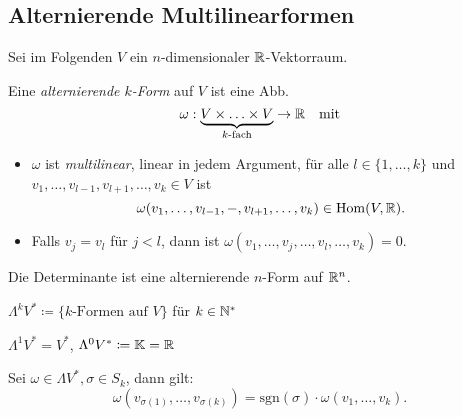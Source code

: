 \documentclass{cheat-sheet}
\theoremstyle{definition}
\begin{document}
\begin{samepage}



\section{Alternierende Multilinearformen}

\begin{nota}
  Sei im Folgenden $V$ ein $n$-dimensionaler $\mathbb{R}$-Vektorraum.
\end{nota}

\begin{defn}
  Eine \emph{alternierende $k$-Form} auf $V$ ist eine Abb.
  \[ \omega : \underbrace{V \times \ldots \times V}_{\text{$k$-fach}} \to \mathbb{R} \quad \text{mit} \]
  \begin{itemize}
    \item $\omega$ ist \emph{multilinear}, \dh{} linear in jedem Argument, \dh{} für alle $l \in \{ 1, \ldots, k \}$ und $v_1, \ldots, v_{l-1}, v_{l+1}, \ldots, v_k \in V$ ist
    \[ \omega(v_1, \ldots, v_{l-1}, -, v_{l+1}, \ldots, v_k) \in \mathrm{Hom}(V, \mathbb{R}). \]
    \item Falls $v_j = v_l$ für $j < l$, dann ist $\omega(v_1, \ldots, v_j, \ldots, v_l, \ldots, v_k) = 0$.
  \end{itemize}
\end{defn}

\begin{bsp}
  Die Determinante ist eine alternierende $n$-Form auf $\mathbb{R}^n$.
\end{bsp}

\begin{nota}
  $\Lambda^k V^* \coloneqq \{ \text{$k$-Formen auf $V$} \}$ für $k \in \mathbb{N}^*$
\end{nota}

\begin{bem}
  $\Lambda^1 V^* = V^*$, $\Lambda^0 V^* \coloneqq \mathbb{K} = \mathbb{R}$
\end{bem}

\begin{lem}
  Sei $\omega \in \Lambda V^*, \sigma \in S_k$, dann gilt:
  \[ \omega(v_{\sigma(1)}, \ldots, v_{\sigma(k)}) = \mathrm{sgn}(\sigma) \cdot \omega(v_1, \ldots, v_k). \]
\end{lem}

\end{samepage}
\end{document}
